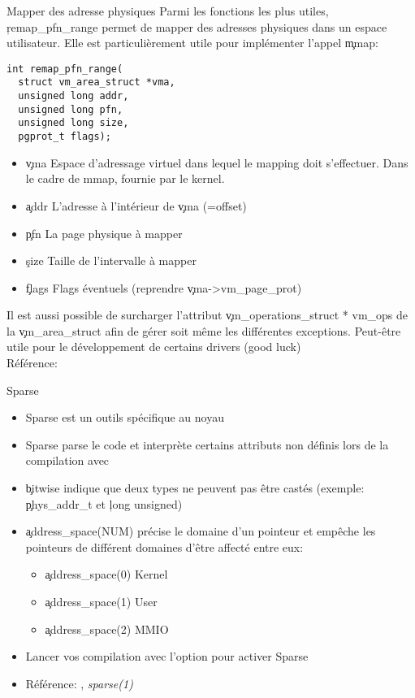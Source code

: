 \begin{frame}[fragile=singleslide]{Mapper des adresse physiques}
  Parmi les  fonctions les plus utiles,  \c{remap_pfn_range} permet de
  mapper des  adresses physiques dans un espace  utilisateur. Elle est
  particulièrement utile pour implémenter l'appel \c{mmap}:
  \begin{lstlisting}
int remap_pfn_range(
  struct vm_area_struct *vma,
  unsigned long addr,
  unsigned long pfn,
  unsigned long size,
  pgprot_t flags);
  \end{lstlisting}
  \begin{itemize}
  \item  \c{vma} Espace  d'adressage virtuel  dans lequel  le mapping
    doit s'effectuer. Dans le cadre de mmap, fournie par le kernel.
  \item \c{addr} L'adresse à l'intérieur de \c{vma} (=offset)
  \item \c{pfn} La page physique à mapper
  \item \c{size} Taille de l'intervalle à mapper
  \item \c{flags} Flags éventuels (reprendre \c{vma->vm_page_prot})
  \end{itemize}

  Il     est    aussi     possible     de    surcharger     l'attribut
  \c{vm_operations_struct *  vm_ops} de la  \c{vm_area_struct} afin de
  gérer soit même les différentes exceptions. Peut-être utile pour le
  développement de certains drivers (good luck)
  \\[2ex]
  Référence: 
\end{frame}

\begin{frame}[fragile=singleslide]{Sparse}
  \begin{itemize}
  \item Sparse est un outils spécifique au noyau
  \item  Sparse parse  le code  et interprète  certains  attributs non
    définis lors de la compilation avec 
  \item \c{bitwise} indique que deux  types ne peuvent pas être castés
    (exemple: \c{phys_addr_t} et \c{long unsigned})
  \item  \c{address_space(NUM)} précise  le domaine  d'un  pointeur et
    empêche les  pointeurs de différent domaines  d'être affecté entre
    eux:
    \begin{itemize}
    \item \c{address_space(0)} Kernel
    \item \c{address_space(1)} User
    \item \c{address_space(2)} MMIO
    \end{itemize}
  \item Lancer  vos compilation  avec l'option   pour activer
    Sparse
  \item Référence: , \emph{sparse(1)}
  \end{itemize}
\end{frame}

